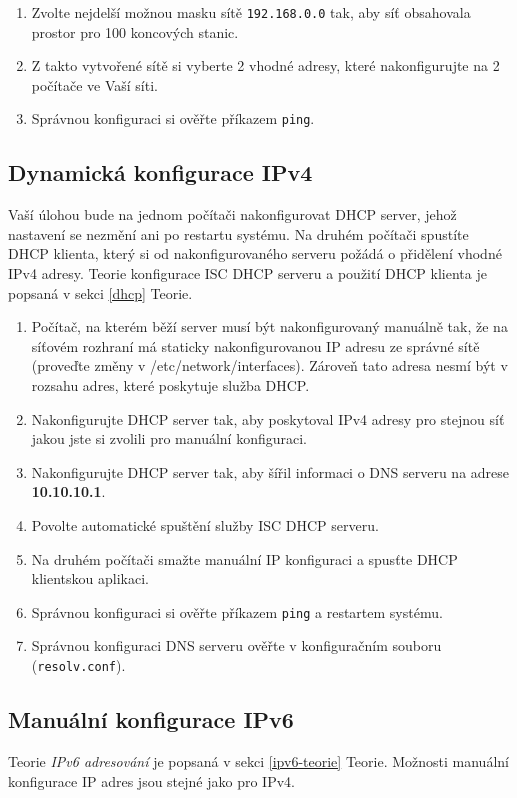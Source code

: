 \begin{enumerate}
    \item Zvolte nejdelší možnou masku sítě \texttt{192.168.0.0} tak, aby síť
        obsahovala prostor pro 100 koncových stanic.
    \item Z takto vytvořené sítě si vyberte 2 vhodné adresy, které
        nakonfigurujte na 2 počítače ve Vaší síti.
    \item Správnou konfiguraci si ověřte příkazem {\tt ping}.
\end{enumerate}

\subsection{Dynamická konfigurace IPv4}

Vaší úlohou bude na jednom počítači nakonfigurovat DHCP server, jehož nastavení se nezmění ani po restartu systému. Na druhém počítači spustíte DHCP klienta, který si od nakonfigurovaného serveru požádá o přidělení vhodné IPv4 adresy. Teorie konfigurace ISC DHCP serveru a použití
DHCP klienta je popsaná v sekci \ref{dhcp} Teorie.

\begin{enumerate}
    \item Počítač, na kterém běží server musí být nakonfigurovaný manuálně tak,
        že na síťovém rozhraní má staticky nakonfigurovanou IP adresu ze správné sítě (proveďte změny v /etc/network/interfaces). Zároveň tato
        adresa nesmí být v rozsahu adres, které poskytuje služba DHCP.
    \item Nakonfigurujte DHCP server tak, aby poskytoval IPv4 adresy pro stejnou
        síť jakou jste si zvolili pro manuální konfiguraci.
    \item Nakonfigurujte DHCP server tak, aby šířil informaci o DNS serveru na
        adrese {\bf 10.10.10.1}.
    \item Povolte automatické spuštění služby ISC DHCP serveru.
    \item Na druhém počítači smažte manuální IP konfiguraci a spusťte DHCP
        klientskou aplikaci.
    \item Správnou konfiguraci si ověřte příkazem {\tt ping} a restartem systému.
    \item Správnou konfiguraci DNS serveru ověřte v konfiguračním souboru
        (\texttt{resolv.conf}).
\end{enumerate}

\subsection{Manuální konfigurace IPv6}
Teorie \emph{IPv6 adresování} je popsaná v sekci \ref{ipv6-teorie} Teorie.
Možnosti manuální konfigurace IP adres jsou stejné jako pro IPv4.


